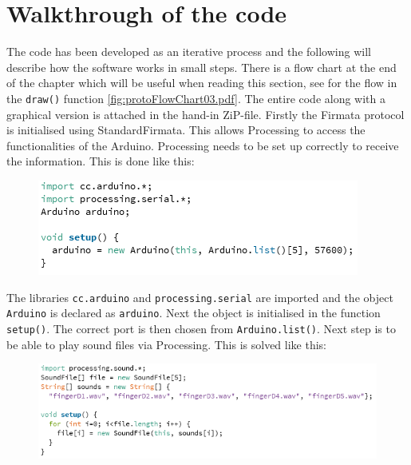 \section{Walkthrough of the code}
The code has been developed as an iterative process and the following will describe how the software works in small steps. There is a flow chart at the end of the chapter which will be useful when reading this section, see for the flow in the \texttt{draw()} function \autoref{fig:protoFlowChart03.pdf}. The entire code along with a graphical version is attached in the hand-in ZiP-file.
Firstly the Firmata protocol is initialised using StandardFirmata. This allows Processing to access the functionalities of the Arduino. Processing needs to be set up correctly to receive the information. This is done like this:

\begin{figure}[H]
\includegraphics[scale=0.8]{Figure/programkode01.png}
\end{figure}
  
  The libraries \texttt{cc.arduino} and \texttt{processing.serial} are imported and the object \texttt{Arduino} is declared as \texttt{arduino}. Next the object is initialised in the function \texttt{setup()}. The correct port is then chosen from \texttt{Arduino.list()}.
Next step is to be able to play sound files via Processing. This is solved like this:

\begin{figure}[H]
\includegraphics[scale=0.8]{Figure/programkode02.png}
\end{figure}  
 
